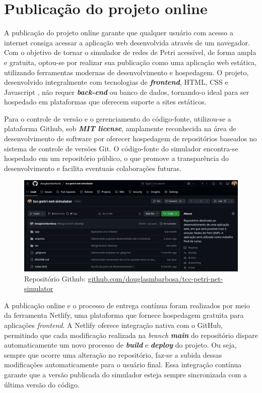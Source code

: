 \documentclass[
	12pt,				%
	openright,			%
	oneside,			%
	a4paper,			%
	english,			%
	brazil				%
	]{abntex2}
\theoremstyle{doispontos}
\begin{document}
\section{Publicação do projeto online}

A publicação do projeto online garante que qualquer usuário com acesso a internet consiga acessar a aplicação web desenvolvida através de um navegador. Com o objetivo de tornar o simulador de redes de Petri acessível, de forma ampla e gratuita, optou-se por realizar sua publicação como uma aplicação web estática, utilizando ferramentas modernas de desenvolvimento e hospedagem. O projeto, desenvolvido integralmente com tecnologias de \textbf{\textit{frontend}}, HTML, CSS e Javascript , não requer \textbf{\textit{back-end}} ou banco de dados, tornando-o ideal para ser hospedado em plataformas que oferecem suporte a sites estáticos. 

Para o controle de versão e o gerenciamento do código-fonte, utilizou-se a plataforma Github, sob \textbf{\textit{MIT license}}, amplamente reconhecida na área de desenvolvimento de software por oferecer hospedagem de repositórios baseados no sistema de controle de versões Git. O código-fonte do simulador encontra-se hospedado em um repositório público, o que promove a transparência do desenvolvimento e facilita eventuais colaborações futuras. 

\begin{figure}[ht] 
	\centering
	\includegraphics[scale=0.33]{figuras/repoGithub.png}
	\caption[Repositório Github]{Repositório Github:  \href{https://github.com/douglasmbarbosa/tcc-petri-net-simulator}{github.com/douglasmbarbosa/tcc-petri-net-simulator}}
	\label{fig:repoGithub}
\end{figure}
\FloatBarrier

A publicação online e o processo de entrega contínua foram realizados por meio da ferramenta Netlify, uma plataforma que fornece hospedagem gratuita para aplicações \textit{frontend}. A Netlify oferece integração nativa com o GitHub, permitindo que cada modificação realizada na \textit{branch} \textbf{\textit{main}} do repositório dispare automaticamente um novo processo de \textbf{\textit{build}} e \textbf{\textit{deploy}} do projeto. Ou seja, sempre que ocorre uma alteração no repositório, faz-se a subida dessas modificações automaticamente para o usuário final. Essa integração contínua garante que a versão publicada do simulador esteja sempre sincronizada com a última versão do código. 
\end{document}
